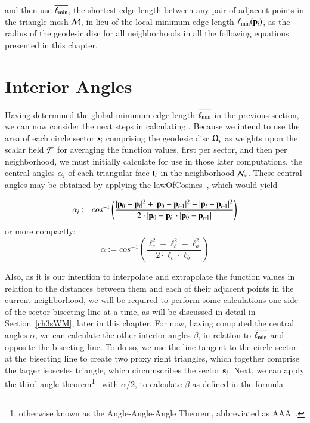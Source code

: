 and then use $\overline{\ell_\text{min}}$, the shortest edge length between any pair of adjacent points in the triangle mesh $\mathcal{M}$, in lieu of the local minimum edge length $\ell_\text{min}(\mathbf{p}_i)$, as the radius of the geodesic disc for all neighborhoods in all the following equations presented in this chapter.

%
%
%
\section{Interior Angles}
\label{ch3sIA}
Having determined the global minimum edge length $\overline{\ell_\text{min}}$ in the previous section, we can now consider the next steps in calculating . Because we intend to use the area of each circle sector $\mathbf{s}_i$ comprising the geodesic disc $\Omega_v$ as weights upon the scalar field $\mathcal{F}$ for averaging the function values, first per sector, and then per neighborhood, we must initially calculate for use in those later computations, the central angles $\alpha_i$ of each triangular face $\mathbf{t}_i$ in the neighborhood $\mathcal{N}_v$. These central angles may be obtained by applying the \gls{lawOfCosines}~\cite{Weisstein19e}, which would yield

\begin{equation}
	\alpha_i := cos^{-1}\left (\frac{|\bp_0 - \bp_{i}|^2 + |\bp_0 - \bp_{\sipo}|^2 - |\bp_i - \bp_{\sipo}|^2}{2\cdot|\bp_0 - \bp_{i}|\cdot|\bp_0 - \bp_{\sipo}|}\right )
\end{equation}
%
or more compactly:
%
\begin{equation}
	\alpha := cos^{-1}\left (\frac{\ell_c^2 + \ell_b^2 - \ell_a^2}{2\cdot\ell_c\cdot\ell_b}\right )
	\label{eq:alphaFromEdgeLengths}
\end{equation}%
%

Also, as it is our intention to interpolate and extrapolate the function values in relation to the distances between them and each of their adjacent points in the current neighborhood, we will be required to perform some calculations one side of the sector-bisecting line at a time, as will be discussed in detail in Section~\ref{ch3sWM}, later in this chapter. For now, having computed the central angles $\alpha$, we can calculate the other interior angles $\beta$, in relation to $\overline{\ell_\text{min}}$ and opposite the bisecting line. To do so, we use the line tangent to the circle sector at the bisecting line to create two proxy right triangles, which together comprise the larger isosceles triangle, which circumscribes the sector $\mathbf{s}_i$. Next, we can apply the third angle theorem\footnote{otherwise known as the Angle-Angle-Angle Theorem, abbreviated as AAA~\cite{Weisstein19f}.}~\cite{Weisstein19f} with $\alpha/2$, to calculate $\beta$ as defined in the formula

